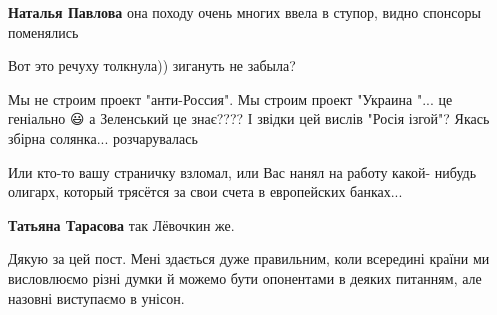 \begin{itemize}
\begin{itemize}
\textbf{Наталья Павлова} она походу очень многих ввела в ступор, видно спонсоры поменялись
\end{itemize}

 
Вот это речуху толкнула)) зигануть не забыла?

 
Мы не строим проект "анти-Россия". Мы строим проект "Украина "... це геніально
😃 а Зеленський це знає???? І звідки цей вислів "Росія ізгой"? Якась збірна
солянка... розчарувалась

 
Или кто-то вашу страничку взломал, или Вас нанял на работу какой- нибудь
олигарх, который трясётся за свои счета в европейских банках...

\begin{itemize}
 
\textbf{Татьяна Тарасова} так Лёвочкин же.
\end{itemize}

 
Дякую за цей пост. Мені здається дуже правильним, коли всередині країни ми висловлюємо різні думки й можемо бути опонентами в деяких питанням, але назовні виступаємо в унісон.

 

\end{itemize}
